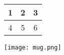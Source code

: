\documentclass{article}
\begin{document}
\begin{table}[h!]
\centering
\begin{tabular}{ |c|c|c| }
\hline 1 & 2 & 3\\
\hline 4 & 5 & 6\\
\hline
\end{tabular}
\end{table}
\texttt{[image: mug.png]}
\end{document}
